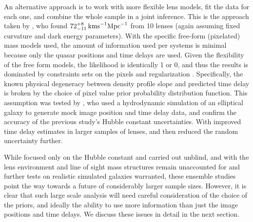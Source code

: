 An alternative approach is to work with more flexible lens models, fit
the data for each one, and combine the whole sample in a joint
inference.  This is the approach taken by \citet{Sah++06}, who found
$72^{+8}_{-11}\,{\rm km s}^{-1}{\rm Mpc}^{-1}$ from 10 lenses (again
assuming fixed curvature and dark energy parameters). With the
specific free-form (pixelated) mass models used, the amount of
information used per systems is minimal because only the quasar
positions and time delays are used. Given the flexibility of the free
form models, the likelihood is identically 1 or 0, and thus the
results is dominated by constraints sets on the pixels and
regularization \cite[see][for a description of pixel-lens in Bayesian
terms]{Col08}. Specifically, the known physical degeneracy between
density profile slope and predicted time delay
\citep{Wuc02,Suyu12} is broken by the choice of pixel value prior probability
distribution function. This assumption was tested by
\citet{Rea++07}, who used a hydrodynamic simulation of an elliptical
galaxy to generate mock image position and time delay data, and
confirm the accuracy of the previous study's Hubble constant
uncertainties. With improved time delay estimates in larger samples of
lenses, \cite{P+J10} and then \citet{RK++2015} reduced the random
uncertainty further. 

While focused only on the Hubble constant and carried out unblind, and
with the lens environment and line of sight mass structures remain
unaccounted for and further tests on realistic simulated galaxies
warranted, these ensemble studies point the way towards a future of
considerably larger sample sizes. However, it is clear that such large
scale analysis will need careful consideration of the choice of the
priors, and ideally the ability to use more information than just the
image positions and time delays. We discuss these issues in detail in
the next section.
